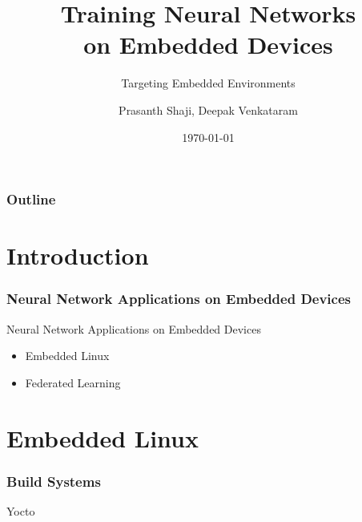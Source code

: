 \documentclass{beamer}
\title{Training Neural Networks \\ on Embedded Devices}
\subtitle{Targeting Embedded Environments}
\author[Prasanth Shaji, Deepak Venkataram] %
{Prasanth Shaji, Deepak Venkataram}
\institute[Dept. of Information Technology] %
{
  Master's Thesis \\
  Uppsala University
}
\date[HDR-NN] %
{\today}
\begin{document}
\begin{frame}[plain] %
  \titlepage
\end{frame}

\begin{frame}
    \frametitle{Outline}
    \tableofcontents[currentsection]
\end{frame}

\section{Introduction}

\begin{frame}
  \frametitle{Neural Network Applications on Embedded Devices}

  Neural Network Applications on Embedded Devices

  \begin{itemize}
    \item Embedded Linux
    \item Federated Learning
  \end{itemize}

\end{frame}

\section{Embedded Linux}

\begin{frame}
  \frametitle{Build Systems}


  Yocto



\end{frame}
\end{document}

